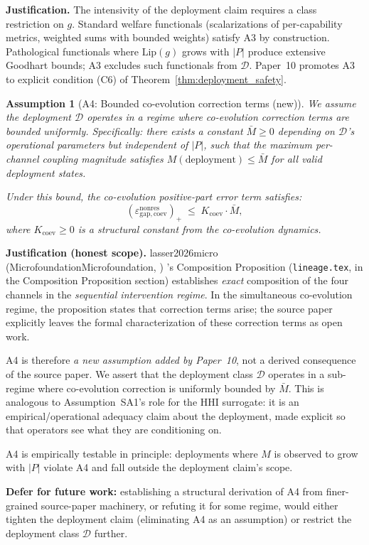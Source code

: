 \documentclass{article}
\makeatletter
\newcommand{\citep}[2][]{%
  \begingroup
  \def\@tmpkey{#2}%
  \ifx\@tmpkey\@empty\else
    (\ifx\@empty#1\@empty\else #1, \fi
     \@nameuse{bibkey@\@tmpkey})%
  \fi
  \endgroup
}
\newtheorem{assumption}{Assumption}
\newcommand{\epsnonresCoev}{\varepsilon_{\mathrm{gap},\mathrm{coev}}^{\mathrm{nonres}}}
\makeatother
\begin{document}
\textbf{Justification.} The intensivity of the deployment claim
requires a class restriction on $g$. Standard welfare functionals
(scalarizations of per-capability metrics, weighted sums with
bounded weights) satisfy A3 by construction. Pathological
functionals where $\mathrm{Lip}(g)$ grows with $|P|$ produce
extensive Goodhart bounds; A3 excludes such functionals from
$\mathcal{D}$. Paper~10 promotes A3 to explicit condition (C6) of
Theorem~\ref{thm:deployment_safety}.

\begin{assumption}[A4: Bounded co-evolution correction terms (new)]
\label{ass:A4}
We assume the deployment $\mathcal{D}$ operates in a regime where
co-evolution correction terms are bounded uniformly. Specifically:
there exists a constant $\bar{M} \geq 0$ depending on $\mathcal{D}$'s
operational parameters but \emph{independent of $|P|$}, such that
the maximum per-channel coupling magnitude satisfies
$M(\text{deployment}) \leq \bar{M}$ for all valid deployment states.

Under this bound, the co-evolution positive-part error term
satisfies:
\[
  (\epsnonresCoev)_+ \;\leq\; K_{\mathrm{coev}} \cdot \bar{M},
\]
where $K_{\mathrm{coev}} \geq 0$ is a structural constant from the
co-evolution dynamics.
\end{assumption}

\textbf{Justification (honest scope).}
\citep[Microfoundation]{lasser2026micro}'s Composition Proposition
(\texttt{lineage.tex}, in
the Composition Proposition section) establishes \emph{exact}
composition of the four channels in the \emph{sequential
intervention regime}. In the simultaneous co-evolution regime, the
proposition states that correction terms arise; the source paper
explicitly leaves the formal characterization of these correction
terms as open work.

A4 is therefore \emph{a new assumption added by Paper~10}, not a
derived consequence of the source paper. We assert that the
deployment class $\mathcal{D}$ operates in a sub-regime where
co-evolution correction is uniformly bounded by $\bar{M}$. This is
analogous to Assumption~SA1's role for the HHI surrogate: it is an
empirical/operational adequacy claim about the deployment, made
explicit so that operators see what they are conditioning on.

A4 is empirically testable in principle: deployments where $M$ is
observed to grow with $|P|$ violate A4 and fall outside the
deployment claim's scope.

\textbf{Defer for future work:} establishing a structural derivation
of A4 from finer-grained source-paper machinery, or refuting it for
some regime, would either tighten the deployment claim
(eliminating A4 as an assumption) or restrict the deployment class
$\mathcal{D}$ further.
\end{document}
